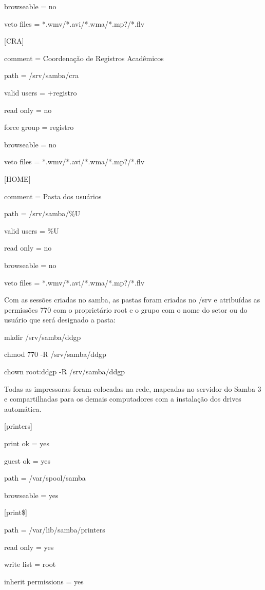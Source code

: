 browseable = no

veto files = *.wmv/*.avi/*.wma/*.mp?/*.flv

[CRA] 

comment = Coordenação de Registros Acadêmicos

path = /srv/samba/cra

valid users = +registro

read only = no

force group = registro

browseable = no

veto files = *.wmv/*.avi/*.wma/*.mp?/*.flv


[HOME] 

comment = Pasta dos usuários

path = /srv/samba/\%U

valid users = \%U

read only = no

browseable = no

veto files = *.wmv/*.avi/*.wma/*.mp?/*.flv

Com as sessões criadas no samba, as pastas foram criadas no /srv e atribuídas as permissões 770 com o proprietário root e o grupo com o nome do setor ou do usuário que será designado a pasta:

mkdir /srv/samba/ddgp

chmod 770 -R /srv/samba/ddgp

chown root:ddgp -R /srv/samba/ddgp

Todas as impressoras foram colocadas na rede, mapeadas no servidor do Samba 3 e compartilhadas para os demais computadores com a instalação dos drives automática.

[printers] 

print ok = yes 

guest ok = yes

path = /var/spool/samba 

browseable = yes

[print\$] 

path = /var/lib/samba/printers 

read only = yes

write list = root 

inherit permissions = yes

